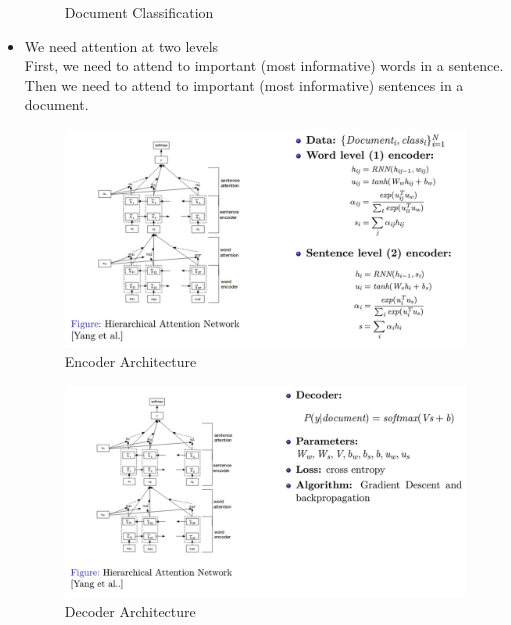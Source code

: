 \documentclass[a4paper]{article}
\begin{document}
\begin{itemize}
\begin{figure}[H]
        \caption{Document Classification}
    \end{figure}
    \item We need attention at two levels\\
    First, we need to attend to important (most informative) words in a sentence.\\
    Then we need to attend to important (most informative) sentences in a document.
    \begin{figure}[H]
        \centering
        \includegraphics[width=\linewidth]{Degree//static/DL_transformer_encoder.png}
        \caption{Encoder Architecture}
    \end{figure}
    \begin{figure}[H]
        \centering
        \includegraphics[width=\linewidth]{Degree//static/DL_transformer_decoder.png}
        \caption{Decoder Architecture}
    \end{figure}
\end{itemize}
\pagebreak
\end{document}
